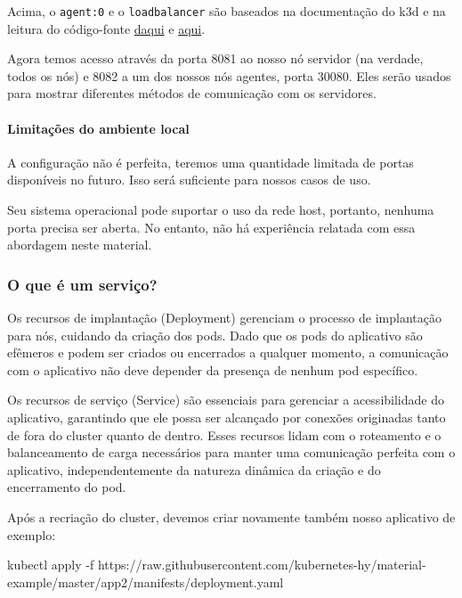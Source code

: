 \documentclass[
]{article}
\newenvironment{Shaded}{}{}
\newcommand{\AttributeTok}[1]{\textcolor[rgb]{0.49,0.56,0.16}{#1}}
\newcommand{\ExtensionTok}[1]{#1}
\newcommand{\NormalTok}[1]{#1}
\begin{document}
Acima, o \texttt{agent:0} e o \texttt{loadbalancer} são baseados na
documentação do k3d e na leitura do código-fonte
\href{https://github.com/k3d-io/k3d/blob/11cc7979228f304025d61254eb0c0cb2745b9444/cmd/util/filter.go\#L119}{daqui}
e
\href{https://github.com/k3d-io/k3d/blob/main/pkg/types/types.go\#L65}{aqui}.

Agora temos acesso através da porta 8081 ao nosso nó servidor (na
verdade, todos os nós) e 8082 a um dos nossos nós agentes, porta 30080.
Eles serão usados para mostrar diferentes métodos de comunicação com os
servidores.

\paragraph{Limitações do ambiente
local}\label{limitauxe7uxf5es-do-ambiente-local}

A configuração não é perfeita, teremos uma quantidade limitada de portas
disponíveis no futuro. Isso será suficiente para nossos casos de uso.

Seu sistema operacional pode suportar o uso da rede host, portanto,
nenhuma porta precisa ser aberta. No entanto, não há experiência
relatada com essa abordagem neste material.

\subsubsection{O que é um serviço?}\label{o-que-uxe9-um-serviuxe7o}

Os recursos de implantação (Deployment) gerenciam o processo de
implantação para nós, cuidando da criação dos pods. Dado que os pods do
aplicativo são efêmeros e podem ser criados ou encerrados a qualquer
momento, a comunicação com o aplicativo não deve depender da presença de
nenhum pod específico.

Os recursos de serviço (Service) são essenciais para gerenciar a
acessibilidade do aplicativo, garantindo que ele possa ser alcançado por
conexões originadas tanto de fora do cluster quanto de dentro. Esses
recursos lidam com o roteamento e o balanceamento de carga necessários
para manter uma comunicação perfeita com o aplicativo, independentemente
da natureza dinâmica da criação e do encerramento do pod.

Após a recriação do cluster, devemos criar novamente também nosso
aplicativo de exemplo:

\begin{Shaded}
\begin{Highlighting}[]
\ExtensionTok{kubectl}\NormalTok{ apply }\AttributeTok{{-}f}\NormalTok{ https://raw.githubusercontent.com/kubernetes{-}hy/material{-}example/master/app2/manifests/deployment.yaml}
\end{Highlighting}
\end{Shaded}
\end{document}
